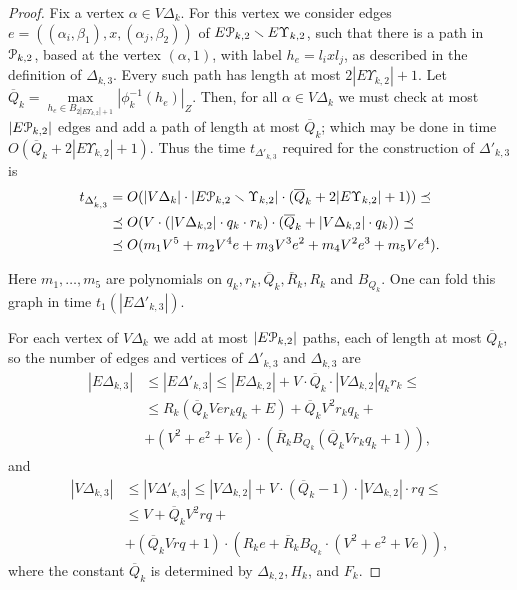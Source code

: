 \documentclass[a4paper,12pt]{article}
\renewcommand{\a}{\alpha }
\renewcommand{\b}{\beta }
\newcommand{\D}{\Delta }
\newcommand{\U}{\Upsilon }
\newcommand{\cP}{{\cal{P}}}
\numberwithin{equation}{section}
\numberwithin{figure}{section}
\begin{document}
\begin{proof}
Fix a vertex $\a \in V\D_k$. For this vertex we consider edges
$e=((\a_i,\b_1), x,(\a_j,\b_2) )$ of $E\cP_{k,2}\smallsetminus E\U_{k,2}$,
such that there
is a path in $\cP_{k,2}$, based at the  vertex $(\a,1)$, with label
$h_e=l_i x l_j$, as described in the definition of $\D_{k,3}$. Every
such path has  length at most  $2 |E \U_{k,2}| +1$. Let
$\overline{Q}_k=\max\limits_{h_e \in B_{2|E \U_{k,2}|
+1}}|\phi^{-1}_k(h_e)|_Z$.
Then, for all $\a \in V\D_k$ we must check at most
$|E\cP_{k,2}|$ edges and add a path of length at most $\overline{Q}_k$;
 which may be done  in time $O(\overline{Q}_k+2 |E\U_{k,2}| +1)$.
Thus the time $t_{\D'_{k,3}}$ required for the construction of $\D'_{k,3}$
is
\begin{equation}\label{theta'3}
\begin{split}
t_{\D'_{k,3}} &= O(|V\D_k|\cdot |E\cP_{k,2}\smallsetminus \U_{k,2}|\cdot (\overline{Q}_k+2 |E \U_{k,2}| +1))\preceq\\
&\preceq     O(V \cdot (|V\D_{k,2}|\cdot q_k \cdot r_k) \cdot
(\overline{Q}_k+|V\D_{k,2}|\cdot q_k))\preceq\\
&\preceq  O(m_1 V^5 + m_2V^4 e +m_3 V^3 e^2 +m_4 V^2 e^3 + m_5 V
e^4).
\end{split}
\end{equation}

Here $m_1, \ldots, m_5$ are polynomials on $q_k, r_k, \overline{Q}_k,
\overline{R}_k, R_k$ and $B_{Q_k}$. One can fold this graph in
time $t_1(|E\D'_{k,3}|)$.

For each vertex of $V\D_k$ we add at most $|E\cP_{k,2}|$ paths, each of
length at most $\overline Q_k$, so the number of edges and
vertices of $\D'_{k,3}$ and $\D_{k,3}$ are
\begin{equation}\label{etheta3}
\begin{split}
|E\D_{k,3}| &\le |E\D'_{k,3}|\le |E\D_{k,2}|+ V \cdot
\overline{Q}_k\cdot |V\D_{k,2}| q_k r_k \le \\
 &\le R_k(\overline{Q}_k V  e r_k q_k + E) +
 \overline{Q}_k V^2 r_k q_k +\\
 &+ (V^2 +e^2+V e)\cdot(\overline{R}_k B_{Q_k}(\overline{Q}_k V r_k q_k +1)),
\end{split}
\end{equation}
and
\begin{equation}\label{vtheta3}
\begin{split}
|V\D_{k,3}| &\le |V \D'_{k,3}|\le |V\D_{k,2}|+ V \cdot(\overline{Q}_k-1)\cdot |V\D_{k,2}|\cdot rq \le\\
 &\le V + \overline{Q}_k V^2 rq + \\
&+(\overline{Q}_k V rq +1)\cdot(R_k e +\overline{R}_k B_{Q_k}
\cdot(V^2 + e^2 + V e)),
\end{split}
\end{equation}
where the constant $\overline{Q}_k$ is determined  by $\D_{k,2}, H_k$, and
$F_k$.


\end{proof}
\end{document}
